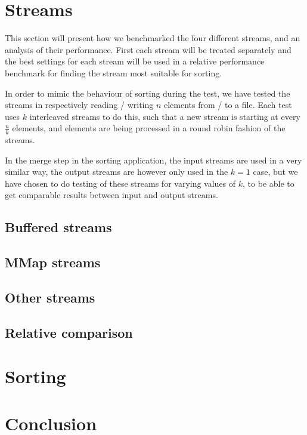 \documentclass[a4paper,12pt]{article}
\begin{document}
\section{Streams}
This section will present how we benchmarked the four different
streams, and an analysis of their performance. First each stream will
be treated separately and the best settings for each stream will be
used in a relative performance benchmark for finding the stream most
suitable for sorting.

In order to mimic the behaviour of sorting during the test, we have
tested the streams in respectively reading / writing $n$ elements from
/ to a file. Each test uses $k$ interleaved streams to do this, such
that a new stream is starting at every $\frac{n}{k}$ elements, and
elements are being processed in a round robin fashion of the streams.

In the merge step in the sorting application, the input streams are
used in a very similar way, the output streams are however only used
in the $k = 1$ case, but we have chosen to do testing of these streams
for varying values of $k$, to be able to get comparable results
between input and output streams.

\subsection{Buffered streams}

\subsection{MMap streams}

\subsection{Other streams}

\subsection{Relative comparison}

\section{Sorting}

%
%

\section{Conclusion}


\clearpage{}
\end{document}
